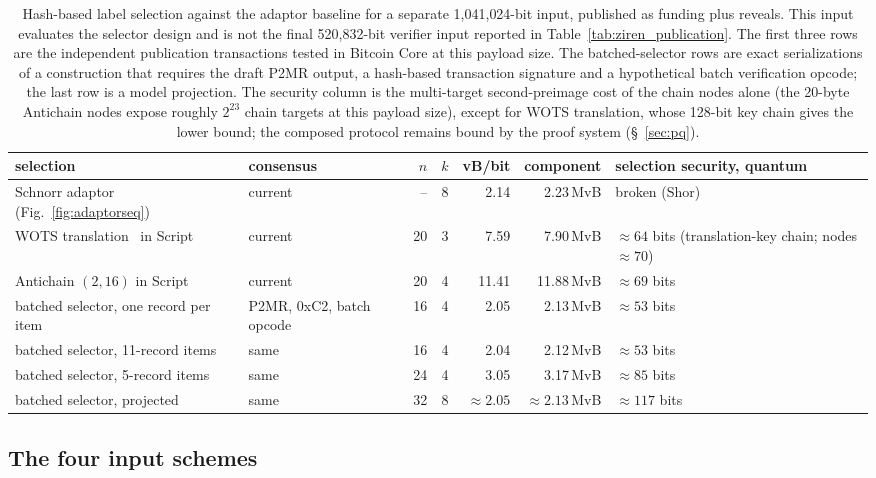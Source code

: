 \documentclass[11pt]{article}
\begin{document}
\begin{table}[t!]\centering\footnotesize\setlength{\tabcolsep}{4pt}
\begin{tabularx}{\textwidth}{>{\raggedright\arraybackslash}p{3.1cm}>{\raggedright\arraybackslash}p{2.5cm}rrrr>{\raggedright\arraybackslash}X}\toprule
selection & consensus & $n$ & $k$ & vB/bit & component & selection security, quantum\\\midrule
Schnorr adaptor (Fig.~\ref{fig:adaptorseq}) & current & -- & 8 & 2.14 & 2.23\,MvB & broken (Shor)\\
WOTS translation~\cite{wotstranslation26} in Script & current & 20 & 3 & 7.59 & 7.90\,MvB & $\approx64$ bits (translation-key chain; nodes $\approx70$)\\
Antichain $(2,16)$ in Script & current & 20 & 4 & 11.41 & 11.88\,MvB & $\approx69$ bits\\
batched selector, one record per item & P2MR, 0xC2, batch opcode & 16 & 4 & 2.05 & 2.13\,MvB & $\approx53$ bits\\
batched selector, 11-record items & same & 16 & 4 & 2.04 & 2.12\,MvB & $\approx53$ bits\\
batched selector, 5-record items & same & 24 & 4 & 3.05 & 3.17\,MvB & $\approx85$ bits\\
batched selector, projected & same & 32 & 8 & $\approx2.05$ & $\approx2.13$\,MvB & $\approx117$ bits\\\bottomrule
\end{tabularx}
\caption{Hash-based label selection against the adaptor baseline for a
separate 1{,}041{,}024-bit input, published as funding plus reveals. This
input evaluates the selector design and is not the final 520{,}832-bit
verifier input reported in Table~\ref{tab:ziren_publication}. The first three rows are the
independent publication transactions tested in Bitcoin Core at this payload size. The batched-selector rows are
exact serializations of a construction that requires the draft
P2MR output, a hash-based transaction signature and a hypothetical batch
verification opcode; the last row is a model projection. The security column
is the multi-target second-preimage cost of the chain nodes alone (the
20-byte Antichain nodes expose roughly $2^{23}$ chain targets at this
payload size), except for WOTS translation, whose 128-bit key chain gives the lower bound; the
composed protocol remains bound by the proof system (\S~\ref{sec:pq}).}
\label{tab:pqsel}
\end{table}

\subsection{The four input schemes}\label{app:schemes}
\end{document}
